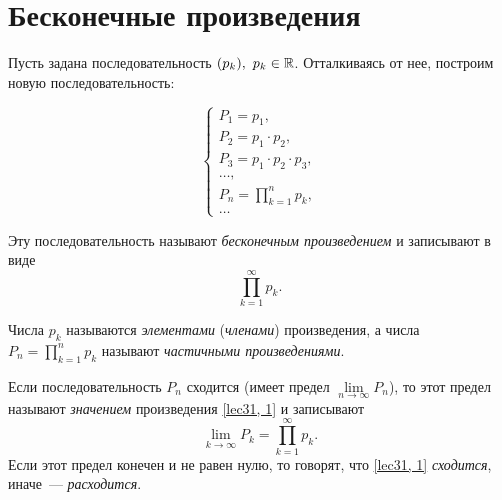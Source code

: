 \documentclass[../../main.tex]{subfiles}
\begin{document}
	\section{Бесконечные произведения}

	Пусть задана последовательность $(p_k),\ p_k \in \R$. Отталкиваясь от нее, 
	построим новую последовательность:

	\[
	\begin{cases}
	P_1 = p_1, \\
	P_2 = p_1 \cdot p_2, \\
	P_3 = p_1 \cdot p_2 \cdot p_3, \\
	\ldots, \\
	P_n = \prod\limits_{k = 1}^{n} p_k, \\
	\ldots
	\end{cases} 
	\]

	Эту последовательность называют \emph{бесконечным произведением} и записывают в виде
	\begin{equation} \label{lec31, 1}
		\prod\limits_{k = 1}^{\infty} p_k.
	\end{equation}
	
	Числа $p_k$ называются \emph{элементами} (\emph{членами}) произведения, а числа $P_n = 
	\prod\limits_{k = 1}^{n} p_k$ называют \emph{частичными произведениями}.
	
	Если последовательность $P_n$ сходится (имеет предел $\lim\limits_{n \to 
	\infty}P_n$), то этот предел называют \emph{значением} произведения \eqref{lec31, 
	1} и записывают
	\[\lim_{k\to\infty} P_k = \prod\limits_{k=1}^\infty p_k.\]
	Если этот предел конечен и не равен нулю, то говорят, что \eqref{lec31, 
	1} \emph{сходится}, иначе~--- \emph{расходится}.
	
\end{document}
